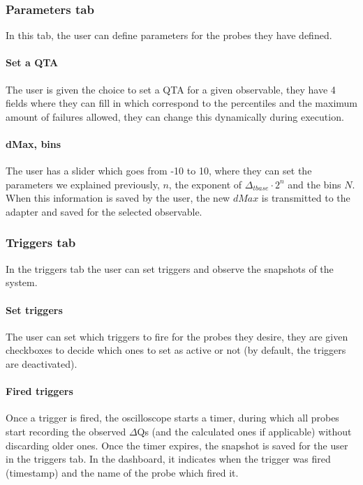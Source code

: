     \subsubsection{Parameters tab}
        In this tab, the user can define parameters for the probes they have defined.

    \paragraph{Set a QTA}
        The user is given the choice to set a QTA for a given observable, they have 4 fields where they can fill in which correspond to the percentiles and the maximum amount of failures allowed, they can change this dynamically during execution.

    \paragraph{dMax, bins}
        The user has a slider which goes from -10 to 10, where they can set the parameters we explained previously, $n$, the exponent of $\Delta_{tbase} \cdot 2^n$ and the bins $N$. When this information is saved by the user, the new $dMax$ is transmitted to the adapter and saved for the selected observable.

    \subsubsection{Triggers tab}
        In the triggers tab the user can set triggers and observe the snapshots of the system.

    \paragraph{Set triggers}
        The user can set which triggers to fire for the probes they desire, they are given checkboxes to decide which ones to set as active or not (by default, the triggers are deactivated).
    
    \paragraph{Fired triggers}
        Once a trigger is fired, the oscilloscope starts a timer, during which all probes start recording the observed $\Delta$Qs (and the calculated ones if applicable) without discarding older ones. Once the timer expires, the snapshot is saved for the user in the triggers tab. In the dashboard, it indicates when the trigger was fired (timestamp) and the name of the probe which fired it.
   
